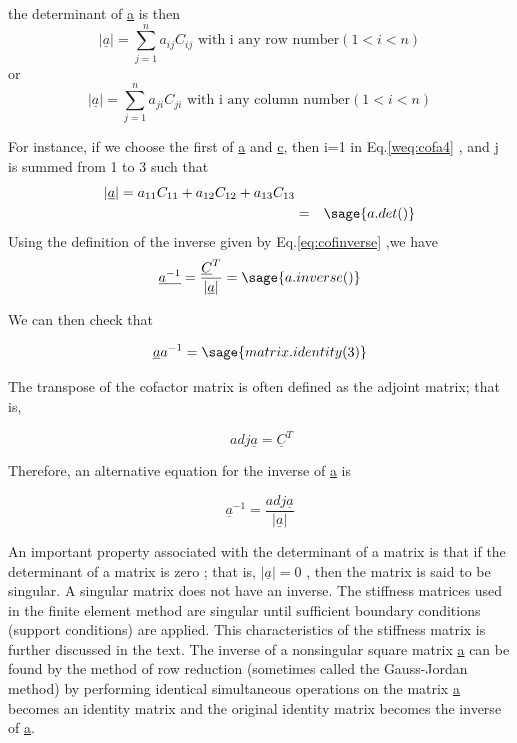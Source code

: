 \documentclass[12pt]{report}
\newcommand{\eref}[1]{
	Eq.\ref{#1}
}
\begin{document}
the determinant of \underline{a} is then 
\begin{equation}
	{|\underline{a}|}=\sum_{j=1}^{n}a_{ij}C_{ij} 
	\text{ with i any row number} 
	(1 < i < n)
	\label{weq:cofa4}
\end{equation}
or
\begin{equation}
	{|\underline{a}|}=\sum_{j=1}^{n}a_{ji}C_{ji} 
	\text{ with i any column number}(1 < i < n) 
\end{equation} 

For instance, if we choose the first of \underline{a} and \underline{c}, 
then i=1 in \eref{weq:cofa4}, and j is summed from 1 to 3 such that
\begin{eqnarray}
	|\underline{a}|=a_{11}C_{11}+a_{12}C_{12}+a_{13}C_{13} \nonumber \\ 
	& = & \sage{a.det()}
\end{eqnarray}
Using the definition of the inverse given by \eref{eq:cofinverse},we have
\begin{equation} 
	\underline{a^{-1}}=\frac{\underline{C}^T}{|\underline{a}|}=\sage{a.inverse()} 
\end{equation}

We can then check that

\begin{equation}
	\underline{a}{a}^{-1}=\sage{matrix.identity(3)}
\end{equation}


The transpose of the cofactor matrix is often defined as the adjoint
matrix; that is,

\begin{equation}
	\ adj\underline{a}=\underline{C}^T 
\end{equation}

Therefore, an alternative equation for the inverse of \underline{a} is


\begin{equation}
	\underline{a}^{-1}=\frac {adj \underline{a}}{|\underline{a}|}
\end{equation}


An important property associated with the determinant of a matrix is
that if the determinant of a matrix is zero ; that is,
$|\underline{a}| =0$ , then the matrix is said to be singular. A
singular matrix does not have an inverse. The stiffness matrices used
in the finite element method are singular until sufficient boundary
conditions (support conditions) are applied. This characteristics of
the stiffness matrix is further discussed in the text.
The inverse of a nonsingular square matrix \underline{a} can be found
by the method of row reduction (sometimes called the Gauss-Jordan
method) by performing identical simultaneous operations on the matrix
\underline{a} becomes an identity matrix and the original identity
matrix becomes the inverse of \underline{a}.
\end{document}
